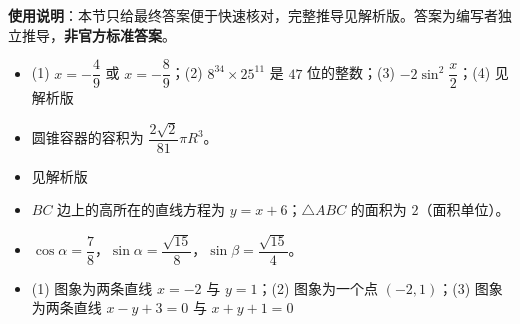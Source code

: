 
\begin{gknotice}
\textbf{使用说明}：本节只给最终答案便于快速核对，完整推导见解析版。答案为编写者独立推导，\textbf{非官方标准答案}。
\end{gknotice}

\begin{itemize}[leftmargin=2.6em]
  \item[\textbf{1.}] (1) $x=-\dfrac49$ 或 $x=-\dfrac89$；(2) $8^{34}\times25^{11}$ 是 $47$ 位的整数；(3) $-2\sin^2\dfrac x2$；(4) 见解析版
  \item[\textbf{2.}] 圆锥容器的容积为 $\dfrac{2\sqrt2}{81}\pi R^3$。
  \item[\textbf{3.}] 见解析版
  \item[\textbf{4.}] $BC$ 边上的高所在的直线方程为 $y=x+6$；$\triangle ABC$ 的面积为 $2$（面积单位）。
  \item[\textbf{5.}] $\cos\alpha=\dfrac78$，$\sin\alpha=\dfrac{\sqrt{15}}8$，$\sin\beta=\dfrac{\sqrt{15}}4$。
  \item[\textbf{6.}] (1) 图象为两条直线 $x=-2$ 与 $y=1$；(2) 图象为一个点 $(-2,1)$；(3) 图象为两条直线 $x-y+3=0$ 与 $x+y+1=0$
\end{itemize}
